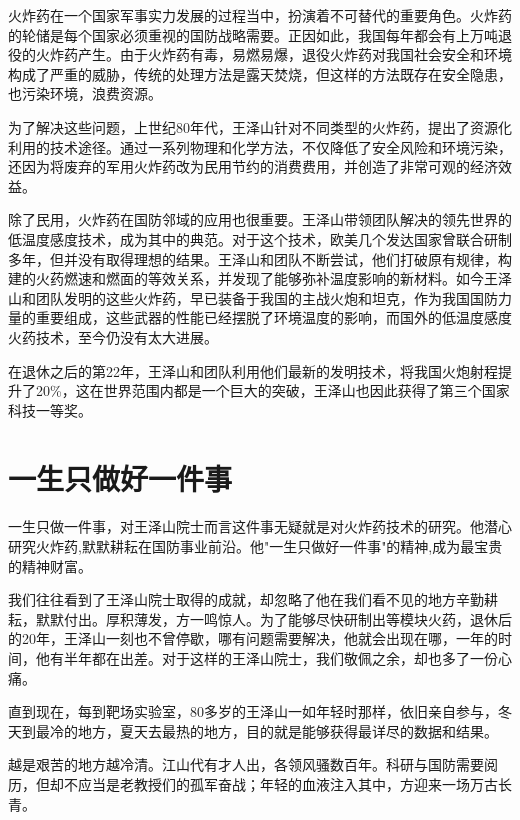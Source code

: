 \documentclass[12pt]{article}%
\begin{document}
火炸药在一个国家军事实力发展的过程当中，扮演着不可替代的重要角色。火炸药的轮储是每个国家必须重视的国防战略需要。正因如此，我国每年都会有上万吨退役的火炸药产生。由于火炸药有毒，易燃易爆，退役火炸药对我国社会安全和环境构成了严重的威胁，传统的处理方法是露天焚烧，但这样的方法既存在安全隐患，也污染环境，浪费资源。

为了解决这些问题，上世纪80年代，王泽山针对不同类型的火炸药，提出了资源化利用的技术途径。通过一系列物理和化学方法，不仅降低了安全风险和环境污染，还因为将废弃的军用火炸药改为民用节约的消费费用，并创造了非常可观的经济效益。

除了民用，火炸药在国防邻域的应用也很重要。王泽山带领团队解决的领先世界的低温度感度技术，成为其中的典范。对于这个技术，欧美几个发达国家曾联合研制多年，但并没有取得理想的结果。王泽山和团队不断尝试，他们打破原有规律，构建的火药燃速和燃面的等效关系，并发现了能够弥补温度影响的新材料。如今王泽山和团队发明的这些火炸药，早已装备于我国的主战火炮和坦克，作为我国国防力量的重要组成，这些武器的性能已经摆脱了环境温度的影响，而国外的低温度感度火药技术，至今仍没有太大进展。

在退休之后的第22年，王泽山和团队利用他们最新的发明技术，将我国火炮射程提升了20\%，这在世界范围内都是一个巨大的突破，王泽山也因此获得了第三个国家科技一等奖。
\section{一生只做好一件事}
一生只做一件事，对王泽山院士而言这件事无疑就是对火炸药技术的研究。他潜心研究火炸药,默默耕耘在国防事业前沿。他"一生只做好一件事"的精神,成为最宝贵的精神财富。

我们往往看到了王泽山院士取得的成就，却忽略了他在我们看不见的地方辛勤耕耘，默默付出。厚积薄发，方一鸣惊人。为了能够尽快研制出等模块火药，退休后的20年，王泽山一刻也不曾停歇，哪有问题需要解决，他就会出现在哪，一年的时间，他有半年都在出差。对于这样的王泽山院士，我们敬佩之余，却也多了一份心痛。

直到现在，每到靶场实验室，80多岁的王泽山一如年轻时那样，依旧亲自参与，冬天到最冷的地方，夏天去最热的地方，目的就是能够获得最详尽的数据和结果。

越是艰苦的地方越冷清。江山代有才人出，各领风骚数百年。科研与国防需要阅历，但却不应当是老教授们的孤军奋战；年轻的血液注入其中，方迎来一场万古长青。
\end{document}
